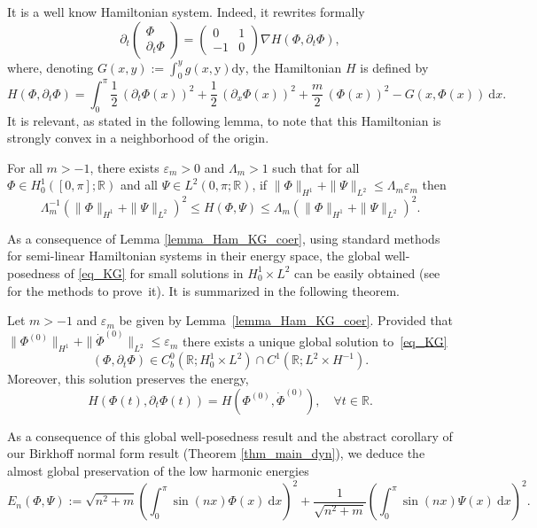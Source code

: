 It is a well know Hamiltonian system. Indeed, it rewrites formally
\[
\partial_t \begin{pmatrix} \Phi \\ \partial_t \Phi \end{pmatrix} = \begin{pmatrix} 0 & 1 \\ -1 & 0 \end{pmatrix} \nabla H (\Phi,\partial_t \Phi),
\]
where, denoting $G(x,y):= \int_0^y g(x,\mathrm{y}) \mathrm{d}\mathrm{y}$, the Hamiltonian $H$ is defined by
\[
H(\Phi,\partial_t \Phi) = \int_0^\pi \frac12\,(\partial_t \Phi(x))^2 + \frac12\,(\partial_x \Phi(x))^2+\frac{m}2\, (\Phi(x))^2 - G(x,\Phi(x)) \ \mathrm{d}x.
\]
It is relevant, as stated in the following lemma, to note that this Hamiltonian is strongly convex in a neighborhood of the origin.
\begin{lemma}\label{lemma_Ham_KG_coer} For all $m>-1$, there exists $\varepsilon_m>0$ and $\Lambda_m>1$ such that for all $\Phi\in H^1_0([0,\pi];\mathbb{R})$ and all $\Psi \in L^2(0,\pi;\mathbb{R})$, if $\| \Phi\|_{H^1}+\|\Psi\|_{L^2}\leq \Lambda_m \varepsilon_m$ then
\[
\Lambda_m^{-1}(\| \Phi\|_{H^1}+\|\Psi\|_{L^2})^2 \leq H(\Phi,\Psi)\leq \Lambda_m (\| \Phi\|_{H^1}+\|\Psi\|_{L^2})^2.
\]
\end{lemma}

As a consequence of Lemma \ref{lemma_Ham_KG_coer}, using standard methods for semi-linear Hamiltonian systems in their energy space, the global well-posedness of \eqref{eq_KG} for small solutions in $H^1_0 \times L^2$ can be easily obtained (see \eg \cite{Caz03} for the methods to prove~it). It is summarized in the following theorem.
\begin{theorem}
\label{thm_GWP_KG}
Let $m>-1$ and $\varepsilon_m$ be given by Lemma~\ref{lemma_Ham_KG_coer}. Provided that $\|\Phi^{(0)}\|_{H^1} +\|\dot{\Phi}^{(0)}\|_{ L^2} \leq \varepsilon_m$ there exists a unique global solution to~\eqref{eq_KG}
\[
(\Phi,\partial_t \Phi) \in C^0_b(\mathbb{R}; H^1_0 \times L^2) \cap C^1(\mathbb{R}; L^2 \times H^{-1}).
\]
Moreover, this solution preserves the energy, \ie
\[
H(\Phi(t),\partial_t \Phi(t)) = H(\Phi^{(0)},\dot{\Phi}^{(0)}), \quad \forall t\in \mathbb{R}.
\]
\end{theorem}

As a consequence of this global well-posedness result and the abstract corollary of our Birkhoff normal form result (\ie Theorem \ref{thm_main_dyn}), we deduce the almost global preservation of the low harmonic energies
\[
E_n(\Phi,\Psi):= \sqrt{n^2+m} \left(\int_0^\pi \sin(n x) \Phi(x) \ \mathrm{d}x \right)^2+ \frac1{\sqrt{n^2+m}} \left(\int_0^\pi \sin(n x) \Psi(x) \ \mathrm{d}x \right)^2.
\]

